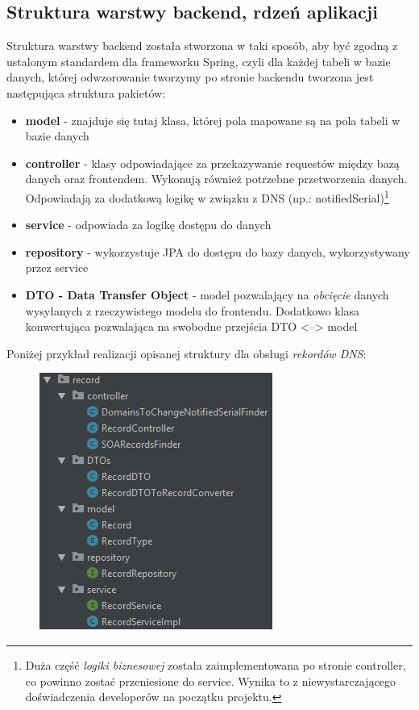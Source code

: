 \documentclass[11pt]{article}
\begin{document}
\subsection{Struktura warstwy backend, rdzeń aplikacji}
Struktura warstwy backend została stworzona w taki sposób, aby być zgodną z ustalonym standardem dla frameworku Spring, czyli dla każdej tabeli w bazie danych, której odwzorowanie tworzymy po stronie backendu tworzona jest następująca struktura pakietów:
\begin{itemize}
\item \textbf{model} - znajduje się tutaj klasa, której pola mapowane są na pola tabeli w bazie danych
\item \textbf{controller} - klasy odpowiadające za przekazywanie requestów między bazą danych oraz frontendem. Wykonują również potrzebne przetworzenia danych. Odpowiadają za dodatkową logikę w związku z DNS (np.: notifiedSerial)\footnote{Duża część \emph{logiki biznesowej} została zaimplementowana po stronie controller, co powinno zostać przeniesione do service. Wynika to z niewystarczającego doświadczenia developerów na początku projektu.}
\item \textbf{service} - odpowiada za logikę dostępu do danych
\item \textbf{repository} - wykorzystuje JPA do dostępu do bazy danych, wykorzystywany przez service
\item \textbf{DTO - Data Transfer Object} - model pozwalający na \emph{obcięcie} danych wysyłanych z rzeczywistego modelu do frontendu. Dodatkowo klasa konwertująca pozwalająca na swobodne przejścia DTO <--> model
\end{itemize}
Poniżej przykład realizacji opisanej struktury dla obsługi \emph{rekordów DNS}:
\begin{figure}[H]
\centering
\includegraphics[scale=1]{res/back_struktura}
\end{figure}
\end{document}
